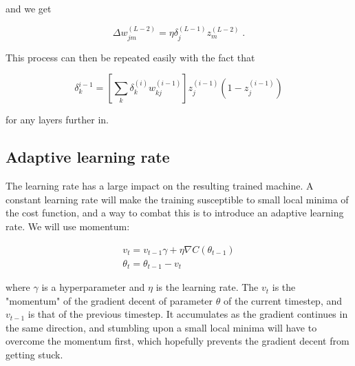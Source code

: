 and we get

\begin{equation}
    \Delta w_{jm}^{(L-2)} = \eta \delta_j^{(L-1)} z_m^{(L-2)} \; .
\end{equation}

This process can then be repeated easily with the fact that

\begin{equation}
    \delta_k^{i-1} =  \left [ \sum_k \delta_k^{(i)} w_{kj}^{(i-1)} \right ] z_j^{(i-1)} \left ( 1 - z_j^{(i-1)} \right  ) 
\end{equation}

for any layers further in.

\subsection{Adaptive learning rate}

The learning rate has a large impact on the resulting trained machine. A constant learning rate will make the training susceptible to small local minima of the cost function, and a way to combat this is to introduce an adaptive learning rate. We will use momentum:

\begin{equation}
  \begin{gathered}
    v_t = v_{t-1}\gamma + \eta \nabla C \left ( \theta_{t-1} \right ) \\
    \theta_t = \theta_{t-1} - v_t \;
  \end{gathered}
  \label{eq:momentum_theory}
\end{equation}


where $\gamma$ is a hyperparameter and $\eta$ is the learning rate. The $v_t$ is the "momentum" of the gradient decent of parameter $\theta$ of the current timestep, and $v_{t-1}$ is that of the previous timestep. It accumulates as the gradient continues in the same direction, and stumbling upon a small local minima will have to overcome the momentum first, which hopefully prevents the gradient decent from getting stuck.


